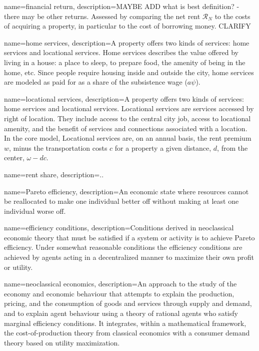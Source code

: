 {
name=financial return,
description={MAYBE ADD what is best definition? - there may be other returns. Assessed by comparing the net rent $\mathcal{R}_N$ to the costs of acquiring a property, in particular to the cost of borrowing money. CLARIFY}
}

{
name=home services,
description={A property offers two kinds of services: home services and \gls{locational services}. Home services describes the value offered by living in a house: a place to sleep, to prepare food, the amenity of being in the home, etc. Since people require housing inside and outside the city, home services are modeled as paid for as a share of the subsistence wage ($a \psi$).}
}

{
name=locational services,
description={A property offers two kinds of services: \gls{home services} and locational services. Locational services are services accessed by right of location. They include access to the central city job, access to locational amenity, and the benefit of services and connections associated with a location. In the core model, Locational services are, on an annual basis, the rent premium $w$, minus the transportation costs $c$ for a property a given distance, $d$, from the center, $\omega- {dc}$.}
}

{
name=rent share,
description={..}
}

{
name=Pareto efficiency,
description={An economic state where resources cannot be reallocated to make one individual better off without making at least one individual worse off.}
}

{
name=efficiency conditions,
description={Conditions derived in neoclassical economic theory that must be satisfied if a system or activity is to achieve Pareto efficiency. Under somewhat reasonable conditions the efficiency conditions are achieved by agents acting in a decentralized manner to maximize their own profit or utility.}
}

{
name=neoclassical economics,
description={An approach to the study of the economy and economic behaviour that attempts to explain the production, pricing, and the consumption of goods and services through supply and demand, and to explain agent behaviour using a theory of rational agents who satisfy \gls{marginal} efficiency conditions. It integrates, within a mathematical framework, the cost-of-production theory from classical economics with a consumer demand theory based on utility maximization.}
}


